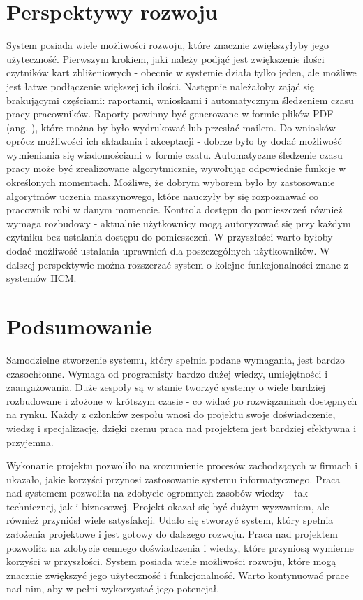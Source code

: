 \section{Perspektywy rozwoju}

System posiada wiele możliwości rozwoju, które znacznie zwiększyłyby jego użyteczność. Pierwszym krokiem, jaki należy podjąć jest zwiększenie ilości czytników kart zbliżeniowych - obecnie w systemie działa tylko jeden, ale możliwe jest łatwe podłączenie większej ich ilości. Następnie należałoby zająć się brakującymi częściami: raportami, wnioskami i automatycznym śledzeniem czasu pracy pracowników. Raporty powinny być generowane w formie plików PDF (ang. ), które można by było wydrukować lub przesłać mailem. Do wniosków - oprócz możliwości ich składania i akceptacji - dobrze było by dodać możliwość wymieniania się wiadomościami w formie czatu. Automatyczne śledzenie czasu pracy może być zrealizowane algorytmicznie, wywołując odpowiednie funkcje w określonych momentach. Możliwe, że dobrym wyborem było by zastosowanie algorytmów uczenia maszynowego, które nauczyły by się rozpoznawać co pracownik robi w danym momencie. Kontrola dostępu do pomieszczeń również wymaga rozbudowy - aktualnie użytkownicy mogą autoryzować się przy każdym czytniku bez ustalania dostępu do pomieszczeń. W przyszłości warto byłoby dodać możliwość ustalania uprawnień dla poszczególnych użytkowników. W dalszej perspektywie można rozszerzać system o kolejne funkcjonalności znane z systemów HCM.

\section{Podsumowanie}

Samodzielne stworzenie systemu, który spełnia podane wymagania, jest bardzo czasochłonne. Wymaga od programisty bardzo dużej wiedzy, umiejętności i zaangażowania. Duże zespoły są w stanie tworzyć systemy o wiele bardziej rozbudowane i złożone w krótszym czasie - co widać po rozwiązaniach dostępnych na rynku. Każdy z członków zespołu wnosi do projektu swoje doświadczenie, wiedzę i specjalizację, dzięki czemu praca nad projektem jest bardziej efektywna i przyjemna.

Wykonanie projektu pozwoliło na zrozumienie procesów zachodzących w firmach i ukazało, jakie korzyści przynosi zastosowanie systemu informatycznego. Praca nad systemem pozwoliła na zdobycie ogromnych zasobów wiedzy - tak technicznej, jak i biznesowej. Projekt okazał się być dużym wyzwaniem, ale również przyniósł wiele satysfakcji. Udało się stworzyć system, który spełnia założenia projektowe i jest gotowy do dalszego rozwoju. Praca nad projektem pozwoliła na zdobycie cennego doświadczenia i wiedzy, które przyniosą wymierne korzyści w przyszłości. System posiada wiele możliwości rozwoju, które mogą znacznie zwiększyć jego użyteczność i funkcjonalność. Warto kontynuować prace nad nim, aby w pełni wykorzystać jego potencjał.